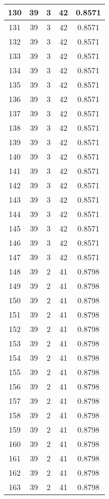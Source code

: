 \documentclass[letterpaper, 12pt]{article}
\begin{document}
\begin{longtable}{|c|c|c|c|c|}
\hline
130 & 39 & 3 & 42 & 0.8571 \\
\hline
131 & 39 & 3 & 42 & 0.8571 \\
\hline
132 & 39 & 3 & 42 & 0.8571 \\
\hline
133 & 39 & 3 & 42 & 0.8571 \\
\hline
134 & 39 & 3 & 42 & 0.8571 \\
\hline
135 & 39 & 3 & 42 & 0.8571 \\
\hline
136 & 39 & 3 & 42 & 0.8571 \\
\hline
137 & 39 & 3 & 42 & 0.8571 \\
\hline
138 & 39 & 3 & 42 & 0.8571 \\
\hline
139 & 39 & 3 & 42 & 0.8571 \\
\hline
140 & 39 & 3 & 42 & 0.8571 \\
\hline
141 & 39 & 3 & 42 & 0.8571 \\
\hline
142 & 39 & 3 & 42 & 0.8571 \\
\hline
143 & 39 & 3 & 42 & 0.8571 \\
\hline
144 & 39 & 3 & 42 & 0.8571 \\
\hline
145 & 39 & 3 & 42 & 0.8571 \\
\hline
146 & 39 & 3 & 42 & 0.8571 \\
\hline
147 & 39 & 3 & 42 & 0.8571 \\
\hline
148 & 39 & 2 & 41 & 0.8798 \\
\hline
149 & 39 & 2 & 41 & 0.8798 \\
\hline
150 & 39 & 2 & 41 & 0.8798 \\
\hline
151 & 39 & 2 & 41 & 0.8798 \\
\hline
152 & 39 & 2 & 41 & 0.8798 \\
\hline
153 & 39 & 2 & 41 & 0.8798 \\
\hline
154 & 39 & 2 & 41 & 0.8798 \\
\hline
155 & 39 & 2 & 41 & 0.8798 \\
\hline
156 & 39 & 2 & 41 & 0.8798 \\
\hline
157 & 39 & 2 & 41 & 0.8798 \\
\hline
158 & 39 & 2 & 41 & 0.8798 \\
\hline
159 & 39 & 2 & 41 & 0.8798 \\
\hline
160 & 39 & 2 & 41 & 0.8798 \\
\hline
161 & 39 & 2 & 41 & 0.8798 \\
\hline
162 & 39 & 2 & 41 & 0.8798 \\
\hline
163 & 39 & 2 & 41 & 0.8798 \\

\end{longtable}
\end{document}
